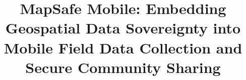 \documentclass[]{interact}
\begin{document}

\title{MapSafe Mobile: Embedding Geospatial Data Sovereignty into Mobile Field Data Collection and Secure Community Sharing}



\maketitle

\end{document}
